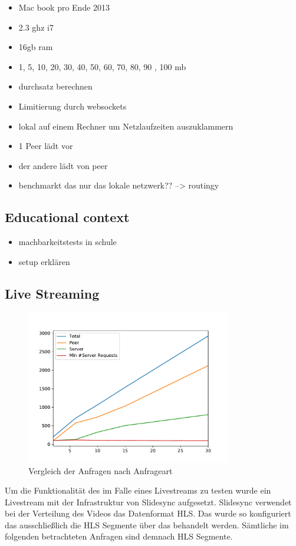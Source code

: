 \begin{itemize}
	\item Mac book pro Ende 2013
	\item 2.3 ghz i7
	\item 16gb ram
	\item 1, 5, 10, 20, 30, 40, 50, 60, 70, 80, 90 , 100 mb
	\item durchsatz berechnen
	\item Limitierung durch websockets
	\item lokal auf einem Rechner um Netzlaufzeiten auszuklammern
	\item 1 Peer lädt vor
	\item der andere lädt von peer
	\item benchmarkt das nur das lokale netzwerk?? --> routingy
\end{itemize}
\subsection{Educational context}
\begin{itemize}
	\item machbarkeitstests in schule
	\item setup erklären
	
\end{itemize}

\subsection{Live Streaming}
\begin{figure}[!h]
	\centering
	\includegraphics[width=0.8\textwidth]{figures/clients_line_chart}
	\caption[A Figure Short-Title]{Vergleich der Anfragen nach Anfrageart}
	\label{fig:live_stream_line_chart}
\end{figure}
Um die Funktionalität des \cdns im Falle eines Livestreams zu testen wurde ein Livestream mit der Infrastruktur von Slidesync aufgesetzt. Slidesync verwendet bei der Verteilung des Videos das Datenformat HLS. Das \cdn wurde so konfiguriert das ausschließlich die HLS Segmente über das \cdn behandelt werden. Sämtliche im folgenden betrachteten Anfragen sind demnach HLS Segmente. 

